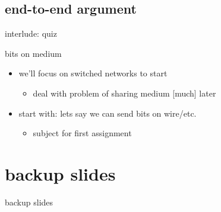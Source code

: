 \subsection{end-to-end argument}



\begin{frame}{interlude: quiz}
\end{frame}

\begin{frame}{bits on medium}
    \begin{itemize}
    \item we'll focus on switched networks to start
        \begin{itemize}
        \item deal with problem of sharing medium [much] later
        \end{itemize}
    \item start with: lets say we can send bits on wire/etc.
        \begin{itemize}
        \item subject for first assignment
        \end{itemize}
    \end{itemize}
\end{frame}





\section{backup slides}
\begin{frame}{backup slides}
\end{frame}


